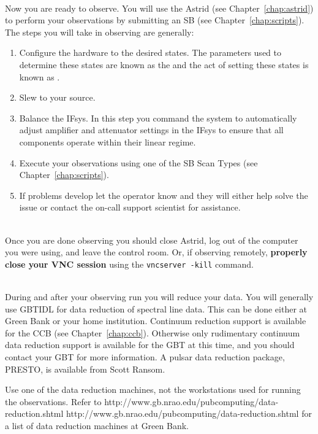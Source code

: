 \begin{description}[leftmargin=*]
\item [Step 7 - Begin observations]\ \\
Now you are ready to observe.  You will use the \gls{Astrid} (see
Chapter~\ref{chap:astrid}) to perform your observations by submitting an
\gls{SB} (see Chapter~\ref{chap:scripts}).  The steps you will take in
observing are generally:
\begin{enumerate}[leftmargin=*,label={\bf \Alph*}]
\item Configure the hardware to the desired states. The parameters used
to determine these states are known as the  and the
act of setting these states is known as .
\item Slew to your source.
\item Balance the \gls{IFsys}. In this step you command the system to
automatically adjust amplifier and attenuator settings in the \gls{IFsys} to
ensure that all components operate within their linear regime.
\item Execute your observations using one of the \gls{SB} Scan Types
(see Chapter~\ref{chap:scripts}).
\item If problems develop let the operator know and they will either help
solve the issue or contact the on-call support scientist for assistance. 
\end{enumerate}

\item [Step 8 - Immediately after observations]\ \\
Once you are done observing you should close \gls{Astrid}, log out of
the computer you were using, and leave the control room.  Or, if
observing remotely, {\bf properly close your \gls{VNC} session} using the
{\tt vncserver -kill} command.

\item [Step 9 - Data reduction]\ \\
During and after your observing run you will reduce your data. You will generally
use \gls{GBTIDL} for data reduction of spectral line data.  This can be done
either at Green Bank or your home institution.  Continuum reduction support is
available for the \gls{CCB} (see Chapter~\ref{chap:ccb}).  Otherwise only rudimentary continuum data reduction
support is available for the \gls{GBT} at this time, and you should contact
your \gls{GBT}  for more information. A pulsar data reduction
package, \gls{PRESTO}, is available from Scott Ransom.

Use one of the data reduction machines, not the workstations used for running
the observations.  Refer to \htmladdnormallink
{http://www.gb.nrao.edu/pubcomputing/data-reduction.shtml}
{http://www.gb.nrao.edu/pubcomputing/data-reduction.shtml}
for a list of data reduction machines at Green Bank.


\end{description}
